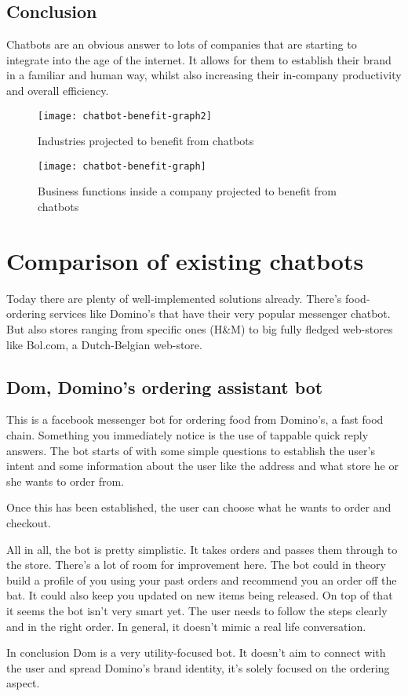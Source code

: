 \subsection{Conclusion}

Chatbots are an obvious answer to lots of companies that are starting to integrate into the age of the internet. It allows for them to establish their brand in a familiar and human way, whilst also increasing their in-company productivity and overall efficiency.

\begin{figure}[p]
  \centering
  \texttt{[image: chatbot-benefit-graph2]}\label{fig:chatbot-benefit-graph2}
  \caption{Industries projected to benefit from chatbots~\cite{chatbot-industry-benefits}}
\end{figure}

\begin{figure}[p]
  \centering
  \texttt{[image: chatbot-benefit-graph]}\label{fig:chatbot-benefit-graph}
  \caption{Business functions inside a company projected to benefit from chatbots~\cite{chatbot-industry-benefits}}
\end{figure}

\newpage

\section{Comparison of existing chatbots}

Today there are plenty of well-implemented solutions already. There's food-ordering services like Domino's that have their very popular messenger chatbot. But also stores ranging from specific ones (H\&M) to big fully fledged web-stores like Bol.com, a Dutch-Belgian web-store.

\subsection{Dom, Domino's ordering assistant bot}

This is a facebook messenger bot for ordering food from Domino's, a fast food chain. Something you immediately notice is the use of tappable quick reply answers. The bot starts of with some simple questions to establish the user's intent and some information about the user like the address and what store he or she wants to order from.

Once this has been established, the user can choose what he wants to order and checkout.

All in all, the bot is pretty simplistic. It takes orders and passes them through to the store. There's a lot of room for improvement here. The bot could in theory build a profile of you using your past orders and recommend you an order off the bat. It could also keep you updated on new items being released. On top of that it seems the bot isn't very smart yet. The user needs to follow the steps clearly and in the right order. In general, it doesn't mimic a real life conversation.

In conclusion Dom is a very utility-focused bot. It doesn't aim to connect with the user and spread Domino's brand identity, it's solely focused on the ordering aspect.